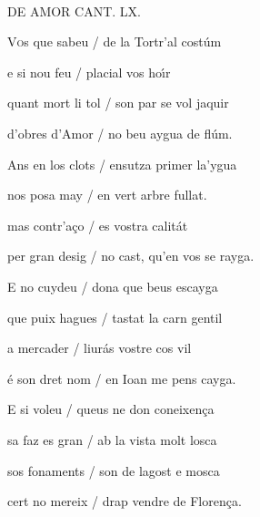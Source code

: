\documentclass[12pt]{article}
\renewcommand{\espaiAbansEtiquetaPoema}{\vspace{0ex}}
\begin{document}
\begin{estrofa}

\espaiAbansEtiquetaPoema

\\

\begin{rubrica}

DE AMOR CANT. LX.

\end{rubrica}

\end{estrofa}


\begin{estrofa}

 V\textsc{o}s que sabeu / de la Tortr'al cost\'{u}m

 e si nou feu / placial vos ho\'{\i}r

 quant mort li tol / son par se vol jaquir

 d'obres d'Amor / no beu aygua de fl\'{u}m.

 Ans en los clots / ensutza primer la'ygua

 nos posa may / en vert arbre fullat.

 mas contr'a\c{c}o / es vostra calit\'{a}t

 per gran desig / no cast, qu'en vos se rayga.

\end{estrofa}



\begin{estrofa}

 E no cuydeu / dona que beus escayga

 que puix hagues / tastat la carn gentil

 a mercader / liur\'{a}s vostre cos vil

 \'{e} son dret nom / en Ioan me pens cayga.

 E si voleu / queus ne don coneixen\c{c}a

 sa faz es gran / ab la vista molt losca

 sos fonaments / son de lagost e mosca

 cert no mereix / drap vendre de Floren\c{c}a.

\end{estrofa}
\end{document}
